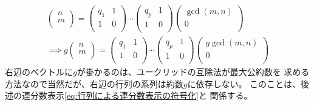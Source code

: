 	\begin{equation*}\begin{split}
		\begin{pmatrix}
			n \\
			m \\
		\end{pmatrix} = \begin{pmatrix}
			q_1 & 1 \\
			1 & 0 \\
		\end{pmatrix} \cdots \begin{pmatrix}
			q_p & 1 \\
			1 & 0 \\
		\end{pmatrix} \begin{pmatrix}
			\gcd(m, n) \\
			0 \\
		\end{pmatrix} \\
		\implies g\begin{pmatrix}
			n \\
			m \\
		\end{pmatrix} = \begin{pmatrix}
			q_1 & 1 \\
			1 & 0 \\
		\end{pmatrix} \cdots \begin{pmatrix}
			q_p & 1 \\
			1 & 0 \\
		\end{pmatrix} \begin{pmatrix}
			g\gcd(m, n) \\
			0 \\
		\end{pmatrix}
	\end{split}\end{equation*}
	右辺のベクトルに$g$が掛かるのは、ユークリッドの互除法が最大公約数を
	求める方法なので当然だが、右辺の行列の系列は約数$g$に依存しない。
	このことは、後述の連分数表示\eqref{eq:行列による連分数表示の符号化}と
	関係する。

